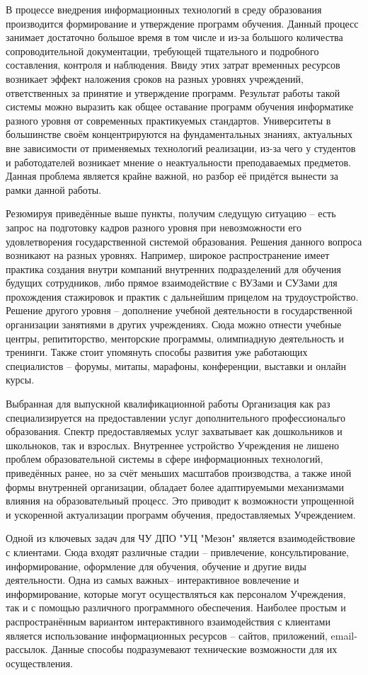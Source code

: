 В процессе внедрения информационных технологий в среду образования производится формирование и утверждение программ обучения.
Данный процесс занимает достаточно большое время в том числе и из-за большого количества сопроводительной документации, требующей тщательного и подробного составления, контроля и наблюдения.
Ввиду этих затрат временных ресурсов возникает эффект наложения сроков на разных уровнях учреждений, ответственных за принятие и утверждение программ.
Результат работы такой системы можно выразить как общее оставание программ обучения информатике разного уровня от современных практикуемых стандартов.
Университеты в большинстве своём концентрируются на фундаментальных знаниях, актуальных вне зависимости от применяемых технологий реализации, из-за чего у студентов и работодателей возникает мнение о неактуальности преподаваемых предметов.
Данная проблема является крайне важной, но разбор её придётся вынести за рамки данной работы.

Резюмируя приведённые выше пункты, получим следущую ситуацию -- есть запрос на подготовку кадров разного уровня при невозможности его удовлетворения государственной системой образования.
Решения данного вопроса возникают на разных уровнях.
Например, широкое распространение имеет практика создания внутри компаний внутренних подразделений для обучения будущих сотрудников, либо прямое взаимодействие с ВУЗами и СУЗами для прохождения стажировок и практик с дальнейшим прицелом на трудоустройство.
Решение другого уровня -- дополнение учебной деятельности в государственной организации занятиями в других учреждениях.
Сюда можно отнести учебные центры, репититорство, менторские программы, олимпиадную деятельность и тренинги.
Также стоит упомянуть способы развития уже работающих специалистов -- форумы, митапы, марафоны, конференции, выставки и онлайн курсы.

Выбранная для выпускной квалификационной работы Организация как раз специализируется на предоставлении услуг дополнительного профессиональго образования.
Спектр предоставляемых услуг захватывает как дошкольников и школьноков, так и взрослых.
Внутреннее устройство Учреждения не лишено проблем образовательной системы в сфере информационных технологий, приведённых ранее, но за счёт меньших масштабов производства, а также иной формы внутренней организации, обладает более адаптируемыми механизмами влияния на образовательный процесс.
Это приводит к возможности упрощенной и ускоренной актуализации программ обучения, предоставляемых Учреждением.

Одной из ключевых задач для ЧУ ДПО "УЦ "Мезон" является взаимодействовие с клиентами.
Сюда входят различные стадии -- привлечение, консультирование, информирование, оформление для обучения, обучение и другие виды деятельности.
Одна из самых важных-- интерактивное вовлечение и информирование, которые могут осуществляться как персоналом Учреждения, так и с помощью различного программного обеспечения.
Наиболее простым и распространённым вариантом интерактивного взаимодействия с клиентами является использование информационных ресурсов -- сайтов, приложений, email-рассылок.
Данные способы подразумевают технические возможности для их осуществления.

